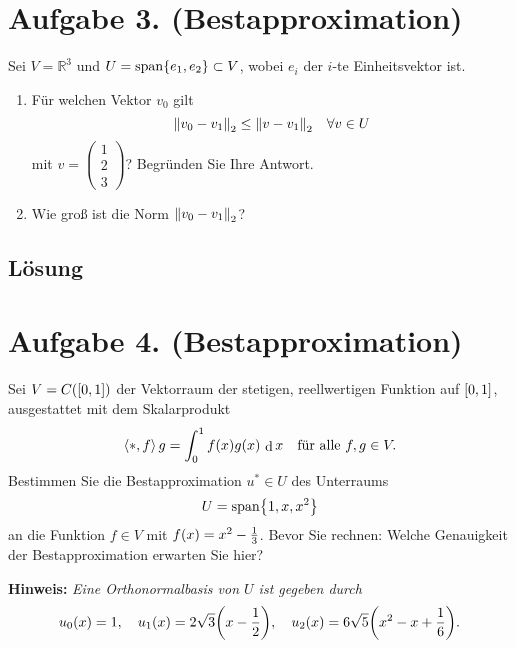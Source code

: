 \documentclass[german,12pt]{homework}
\newcommand{\RR}{\mathbb{R}}
\newcommand{\dotproduct}[2]{\left\langle{#1, #2}\right\rangle}
\newcommand{\dd}{\,\differ}
\DeclareMathOperator{\differ}{d}
\DeclareMathOperator{\vecspan}{span}
\DeclarePairedDelimiter{\norm}{\lVert}{\rVert}
\DeclarePairedDelimiter{\enbrace}{(}{)}
\DeclarePairedDelimiter{\benbrace}{[}{]}
\DeclarePairedDelimiter{\penbrace}{\{}{\}}
\begin{document}
    \section*{Aufgabe 3. (Bestapproximation)}

    \begin{problem}
        Sei \(V = \RR^3\) und \(U = \vecspan\penbrace*{e_1, e_2} \subset V\), wobei \(e_i\) der \(i\)-te Einheitsvektor ist.
        \begin{enumerate}
            \item Für welchen Vektor \(v_0\) gilt
            \[\norm*{v_0 - v_1}_2 \le \norm*{v - v_1}_2 \quad \forall{v \in U}\]
            mit \(v = \begin{pmatrix}1\\2\\3\end{pmatrix}\)? Begründen Sie Ihre Antwort.
            \item Wie groß ist die Norm \(\norm*{v_0 - v_1}_2\)?
        \end{enumerate}
    \end{problem}

    \subsection*{Lösung}

    \section*{Aufgabe 4. (Bestapproximation)}

    \begin{problem}
        Sei \(V = C\enbrace*{\benbrace*{0, 1}}\) der Vektorraum der stetigen, reellwertigen Funktion auf \(\benbrace*{0, 1}\), ausgestattet mit dem Skalarprodukt
        \[\dotproduct*{f}{g} = \int_0^1f\enbrace*{x}g\enbrace*{x}\dd{x} \quad \text{für alle }f, g \in V.\]
        Bestimmen Sie die Bestapproximation \(u^* \in U\) des Unterraums
        \[U = \vecspan\penbrace*{1, x, x^2}\]
        an die Funktion \(f \in V\) mit \(f\enbrace*{x} = x^2 - \frac{1}{3}\). Bevor Sie rechnen: Welche Genauigkeit der Bestapproximation erwarten Sie hier?

        \textbf{Hinweis:} \quad \emph{Eine Orthonormalbasis von \(U\) ist gegeben durch
        \[u_0\enbrace*{x} = 1, \quad u_1\enbrace*{x} = 2\sqrt{3}\enbrace*{x - \frac{1}{2}}, \quad u_2\enbrace*{x} = 6\sqrt{5}\enbrace*{x^2 - x + \frac{1}{6}}.\]}
    \end{problem}
\end{document}
